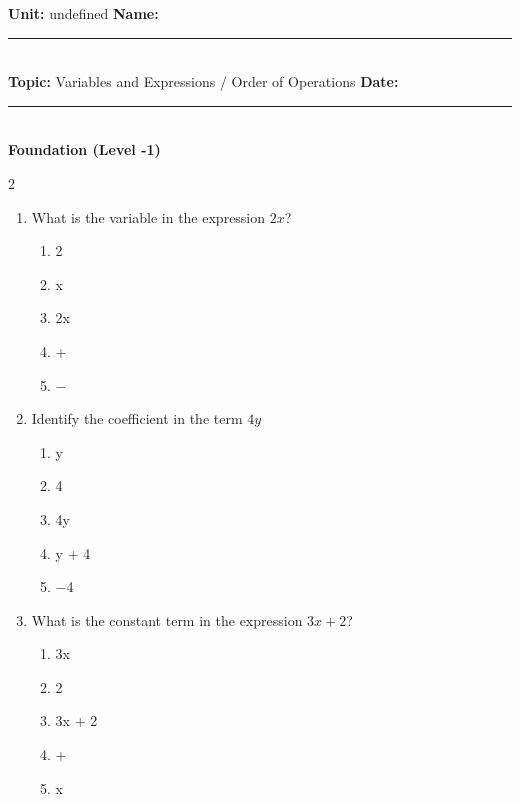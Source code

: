 \documentclass[10pt]{article}
\begin{document}
\enlargethispage{2.5cm}

\begin{tcolorbox}[colback=mainblue!5, colframe=mainblue, sharp corners, boxrule=0.5pt]
    \small \textbf{Unit:} undefined \hfill \textbf{Name:} \rule{3cm}{0.4pt} \\
    \small \textbf{Topic:} Variables and Expressions / Order of Operations \hfill \textbf{Date:} \rule{2cm}{0.4pt} \\
    \centering \textbf{\large Foundation (Level -1)}
\end{tcolorbox}

\vspace{0.2cm}

\begin{multicols}{2}
\begin{enumerate}[label=\textbf{Q\arabic*.}, leftmargin=*, itemsep=6pt, parsep=0pt]

  \item \small What is the variable in the expression $2x$?
  \begin{enumerate}[label=(\Alph*), leftmargin=0.6cm, nosep, itemsep=2pt]
    \item 2
    \item x
    \item 2x
    \item +
    \item $-$
  \end{enumerate}

  \item \small Identify the coefficient in the term $4y$
  \begin{enumerate}[label=(\Alph*), leftmargin=0.6cm, nosep, itemsep=2pt]
    \item y
    \item 4
    \item 4y
    \item y + 4
    \item $-$4
  \end{enumerate}

  \item \small What is the constant term in the expression $3x + 2$?
  \begin{enumerate}[label=(\Alph*), leftmargin=0.6cm, nosep, itemsep=2pt]
    \item 3x
    \item 2
    \item 3x + 2
    \item +
    \item x
  \end{enumerate}


\end{enumerate}
\end{multicols}
\end{document}
